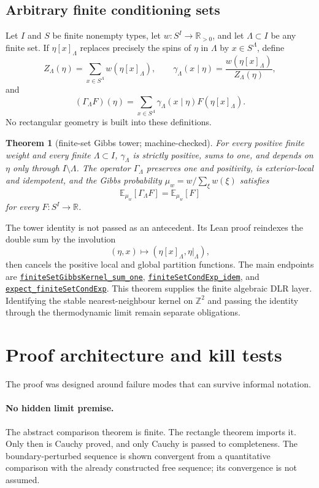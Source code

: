 \documentclass[11pt]{article}
\newtheorem{theorem}{Theorem}[section]
\theoremstyle{definition}
\newcommand{\R}{\mathbb R}
\newcommand{\Z}{\mathbb Z}
\newcommand{\E}{\mathbb E}
\newcommand{\sourceanchor}{f587b35001f4ae87c7fe0383662864df6bc9a1c0}
\newcommand{\leanline}[3]{%
  \href{https://github.com/lluiseriksson/THE-ERIKSSON-PROGRAMME/blob/\sourceanchor/YangMills/OS/#1.lean\#L#2}{\nolinkurl{#3}}}
\begin{document}
\subsection{Arbitrary finite conditioning sets}

Let $I$ and $S$ be finite nonempty types, let $w:S^I\to\R_{>0}$, and let
$\Lambda\subset I$ be any finite set.  If
$\eta[x]_\Lambda$ replaces precisely the spins of $\eta$ in $\Lambda$ by
$x\in S^\Lambda$, define
\[
 Z_\Lambda(\eta)=\sum_{x\in S^\Lambda}w(\eta[x]_\Lambda),\qquad
 \gamma_\Lambda(x\mid\eta)=
   \frac{w(\eta[x]_\Lambda)}{Z_\Lambda(\eta)},
\]
and
\[
 (\Gamma_\Lambda F)(\eta)=
   \sum_{x\in S^\Lambda}\gamma_\Lambda(x\mid\eta)
       F(\eta[x]_\Lambda).
\]
No rectangular geometry is built into these definitions.

\begin{theorem}[finite-set Gibbs tower; machine-checked]
\label{thm:finite-dlr}
For every positive finite weight and every finite $\Lambda\subset I$,
$\gamma_\Lambda$ is strictly positive, sums to one, and depends on $\eta$ only
through $I\setminus\Lambda$.  The operator $\Gamma_\Lambda$ preserves one and
positivity, is exterior-local and idempotent, and the Gibbs probability
$\mu_w=w/\sum_\xi w(\xi)$ satisfies
\[
   \E_{\mu_w}[\Gamma_\Lambda F]=\E_{\mu_w}[F]
\]
for every $F:S^I\to\R$.
\end{theorem}

The tower identity is not passed as an antecedent.  Its Lean proof reindexes
the double sum by the involution
\[
  (\eta,x)\longmapsto(\eta[x]_\Lambda,\eta|_\Lambda),
\]
then cancels the positive local and global partition functions.  The main
endpoints are
\leanline{DobrushinFiniteSetDLR}{78}{finiteSetGibbsKernel_sum_one},
\leanline{DobrushinFiniteSetDLR}{146}{finiteSetCondExp_idem}, and
\leanline{DobrushinFiniteSetDLR}{209}{expect_finiteSetCondExp}.
This theorem supplies the finite algebraic DLR layer.  Identifying the stable
nearest-neighbour kernel on $\Z^2$ and passing the identity through the
thermodynamic limit remain separate obligations.

\section{Proof architecture and kill tests}

The proof was designed around failure modes that can survive informal
notation.

\paragraph{No hidden limit premise.}
The abstract comparison theorem is finite.  The rectangle theorem imports it.
Only then is Cauchy proved, and only Cauchy is passed to completeness.  The
boundary-perturbed sequence is shown convergent from a quantitative comparison
with the already constructed free sequence; its convergence is not assumed.
\end{document}
